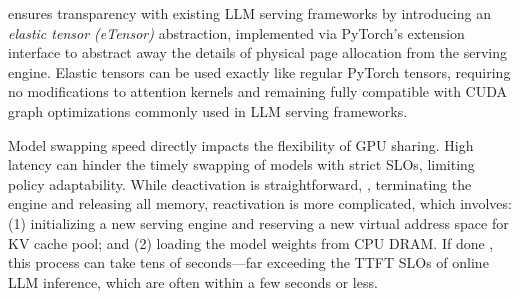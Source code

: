  ensures transparency with existing LLM serving frameworks by introducing an \textit{elastic tensor (eTensor)} abstraction, implemented via PyTorch's extension interface
to abstract away the details of physical page allocation from the serving engine. 
Elastic tensors can be used exactly like regular PyTorch tensors, requiring no modifications to attention kernels and remaining fully compatible with CUDA graph optimizations commonly used in LLM serving frameworks.

\label{sec:model-loading}
Model swapping speed directly impacts the flexibility of GPU sharing. High latency can hinder the timely swapping of models with strict SLOs, limiting policy adaptability.
While deactivation is straightforward, \ie, terminating the engine and releasing all memory, reactivation is more complicated, which involves:
(1) initializing a new serving engine and reserving a new virtual address space for KV cache pool; and
(2) loading the model weights from CPU DRAM.
If done \naively, this process can take tens of seconds---far exceeding the TTFT SLOs of online LLM inference, which are often within a few seconds or less.

